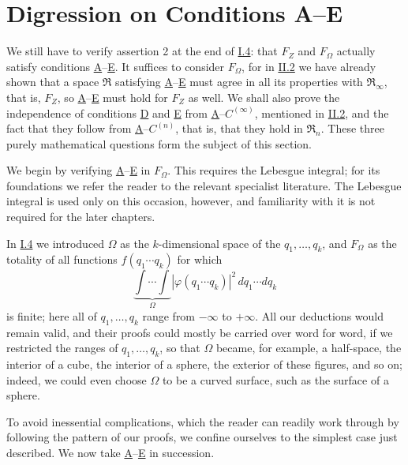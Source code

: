 \documentclass[fontsize=13pt,twoside,openany,headings=normal,parskip=false,bookmarkpackage=false,DIV=calc]{scrbook}
\begin{document}
\section[Digression on Conditions A--E]{Digression on Conditions A--E\texorpdfstring{}{}}\label{sec:II.3}
We still have to verify assertion 2 at the end of \hyperref[sec:I.4]{I.4}: that $F_Z$ and $F_\Omega$ actually satisfy conditions \hyperref[ax:II.A]{A}--\hyperref[ax:II.E]{E}. It suffices to consider $F_\Omega$, for in \hyperref[sec:II.2]{II.2} we have already shown that a space $\mathfrak{R}$ satisfying \hyperref[ax:II.A]{A}--\hyperref[ax:II.E]{E} must agree in all its properties with $\mathfrak{R}_\infty$, that is, $F_Z$, so \hyperref[ax:II.A]{A}--\hyperref[ax:II.E]{E} must hold for $F_Z$ as well. We shall also prove the independence of conditions \hyperref[ax:II.D]{D} and \hyperref[ax:II.E]{E} from \hyperref[ax:II.A]{A}--\hyperref[ax:II.Cinfty]{$C^{(\infty)}$}, mentioned in \hyperref[sec:II.2]{II.2}, and the fact that they follow from \hyperref[ax:II.A]{A}--\hyperref[ax:II.Cn]{$C^{(n)}$}, that is, that they hold in $\mathfrak{R}_n$. These three purely mathematical questions form the subject of this section.

We begin by verifying \hyperref[ax:II.A]{A}--\hyperref[ax:II.E]{E} in $F_\Omega$. This requires the Lebesgue integral; for its foundations we refer the reader to the relevant specialist literature. The Lebesgue integral is used only on this occasion, however, and familiarity with it is not required for the later chapters.

In \hyperref[sec:I.4]{I.4} we introduced $\Omega$ as the $k$-dimensional space of the $q_1,\ldots,q_k$, and $F_\Omega$ as the totality of all functions $f(q_1\cdots q_k)$ for which
\[
\underbrace{\int\cdots\int}_{\Omega}|\varphi(q_1\cdots q_k)|^2\,dq_1\cdots dq_k
\]
is finite; here all of $q_1,\ldots,q_k$ range from $-\infty$ to $+\infty$. All our deductions would remain valid, and their proofs could mostly be carried over word for word, if we restricted the ranges of $q_1,\ldots,q_k$, so that $\Omega$ became, for example, a half-space, the interior of a cube, the interior of a sphere, the exterior of these figures, and so on; indeed, we could even choose $\Omega$ to be a curved surface, such as the surface of a sphere.

\hypertarget{origpage-32}{}%
To avoid inessential complications, which the reader can readily work through by following the pattern of our proofs, we confine ourselves to the simplest case just described. We now take \hyperref[ax:II.A]{A}--\hyperref[ax:II.E]{E} in succession.
\end{document}
